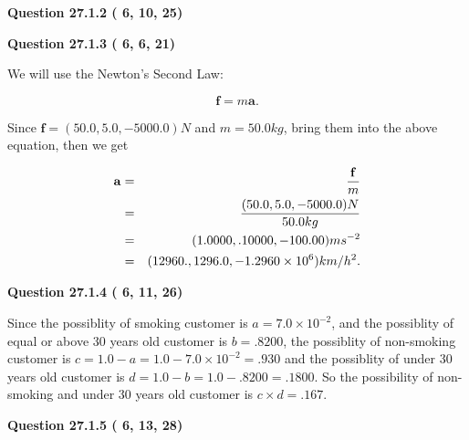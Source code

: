 \documentclass[12pt]{article}
\begin{document}
 
 
  
\vspace{0.2in}
  
{\textbf{\Large{Question
27.1.2 
 (          6,         10,         25)
}}}
  
  
  
\vspace{0.2in}
  
{\textbf{\Large{Question
27.1.3 
 (          6,          6,         21)
}}}
  
  
 
 

We will use the Newton's Second Law:
 
\[
\mathbf{f}=m\mathbf{a}.
\]
 
Since $\mathbf{f}=( %
50.0,  %
5.0,  %
-5000.0 )N$
and $m= %
50.0 kg$, bring them into the above equation, then we get
 
\begin{eqnarray*}
\mathbf{a}&=&\frac{\mathbf{f}}m  \\
&=&\frac{(
50.0 ,
5.0 ,
-5000.0 )N
}{ %
50.0 kg}  \\
&=&(
1.0000 ,
.10000,
-100.00
)ms^{-2} \\
&=&(
12960. ,
1296.0 ,
-1.2960 \times 10^{6}
)km/h^2.
\end{eqnarray*}
 
 
 
  
\vspace{0.2in}
  
{\textbf{\Large{Question
27.1.4 
 (          6,         11,         26)
}}}
  
  
 
 

Since the possiblity of  %
smoking customer is $ a =  %
7.0 \times 10^{-2} $,
and the possiblity of  %
equal or above 30 years old customer is $ b =  %
.8200 $,
the possiblity of  %
non-smoking customer is $ c = 1.0 - a = 1.0 -
7.0 \times 10^{-2}
=  %
.930 $ and the possiblity of  %
under 30 years old
customer is $ d = 1.0 - b = 1.0 -  %
.8200 =  %
.1800  $.
So the possibility of  %
 non-smoking and  %
under 30 years old
customer is $ c \times d =  %
.167 $.
 
 
 
  
\vspace{0.2in}
  
{\textbf{\Large{Question
27.1.5 
 (          6,         13,         28)
}}}
  
  
  
\vspace{0.2in}
  
\end{document}
